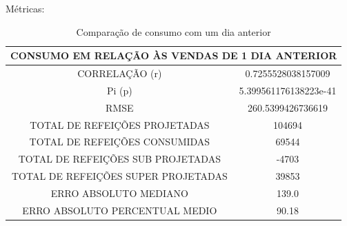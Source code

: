 \documentclass[	12pt, Times, openright, twoside, a4paper, english, brazil]{abntex2}
\begin{document}
                    \begin{figure}[H]
                    \end{figure}
                    
                    
                    Métricas:
                    
                   \begin{table}[!ht]
                   \centering
                   \caption{Comparação de consumo com um dia anterior}
                     \begin{tabular}{|c|c|}\hline
                    \multicolumn{2}{c}{CONSUMO EM RELAÇÃO ÀS VENDAS DE 1 DIA ANTERIOR}\\ \hline
                    CORRELAÇÃO (r) &  0.7255528038157009\\
                    Pi (p) &5.399561176138223e-41\\
                    RMSE & 260.5399426736619\\
                    TOTAL DE REFEIÇÕES PROJETADAS & 104694\\ 
                    TOTAL DE REFEIÇÕES CONSUMIDAS & 69544\\
                    TOTAL DE REFEIÇÕES SUB PROJETADAS & -4703\\
                    TOTAL DE REFEIÇÕES SUPER PROJETADAS & 39853\\
                    ERRO ABSOLUTO MEDIANO & 139.0\\
                    ERRO ABSOLUTO PERCENTUAL MEDIO & 90.18\\\hline
                    \end{tabular} \end{table}
                    
\end{document}
